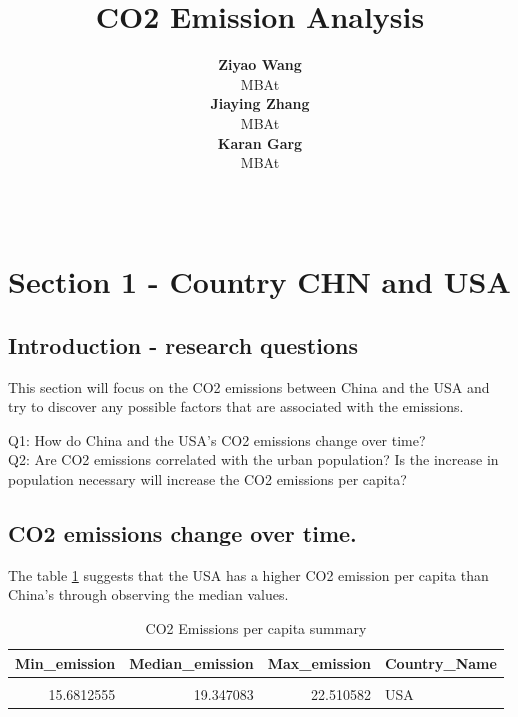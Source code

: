 \documentclass[11pt,a4paper,]{article}
\title{CO2 Emission Analysis}
\author{\sf\Large\textbf{ Ziyao Wang}\\ {\sf\large MBAt\\[0.5cm]} \sf\Large\textbf{ Jiaying Zhang}\\ {\sf\large MBAt\\[0.5cm]} \sf\Large\textbf{ Karan Garg}\\ {\sf\large MBAt\\[0.5cm]}}
\date{\sf\Date~\Month~\Year}
\makeatletter
\def\titlepage{\front{\expandafter{\@title}}{\@author}{\@organization}}
\makeatother
\begin{document}
\titlepage

{
\setcounter{tocdepth}{2}
\tableofcontents
}
\clearpage

\hypertarget{section-1---country-chn-and-usa}{%
\section{Section 1 - Country CHN and USA}\label{section-1---country-chn-and-usa}}

\hypertarget{introduction---research-questions}{%
\subsection{Introduction - research questions}\label{introduction---research-questions}}

This section will focus on the CO2 emissions between China and the USA and try to discover any possible factors that are associated with the emissions.

Q1: How do China and the USA's CO2 emissions change over time?\\
Q2: Are CO2 emissions correlated with the urban population? Is the increase in population necessary will increase the CO2 emissions per capita?

\hypertarget{co2-emissions-change-over-time.}{%
\subsection{CO2 emissions change over time.}\label{co2-emissions-change-over-time.}}

The table \ref{tab:sumtable} suggests that the USA has a higher CO2 emission per capita than China's through observing the median values.

\begin{table}[!h]

\caption{\label{tab:sumtable}CO2 Emissions per capita summary}
\centering
\begin{tabular}[t]{rrrl}
\toprule
Min\_emission & Median\_emission & Max\_emission & Country\_Name\\
\midrule
\cellcolor{gray!6}{0.5741621} & \cellcolor{gray!6}{2.038411} & \cellcolor{gray!6}{7.557211} & \cellcolor{gray!6}{China}\\
15.6812555 & 19.347083 & 22.510582 & USA\\
\bottomrule
\end{tabular}
\end{table}

\clearpage
\end{document}
